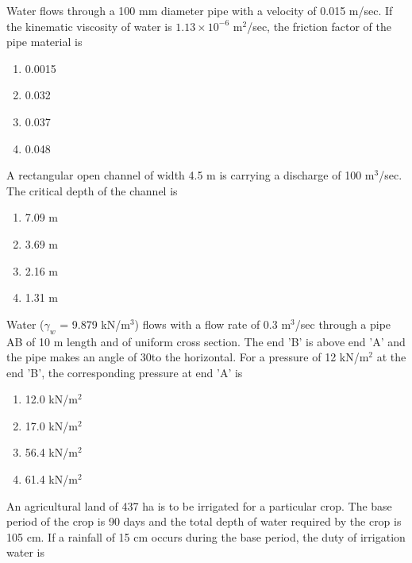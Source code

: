 \iffalse
\chapter{2009}
\author{AI24BTECH11009}
\section{ce}
\fi

\item Water flows through a 100 mm diameter pipe with a velocity of 0.015 m/sec. If the kinematic viscosity of water is $1.13 \times 10^{-6}$ $\text{m}^2$/sec, the friction factor of the pipe material is
    \begin{enumerate}
        \item 0.0015
        \item 0.032
        \item 0.037
        \item 0.048 \\
    \end{enumerate}
\item A rectangular open channel of width 4.5 m is carrying a discharge of 100 $\text{m}^3$/sec. The critical depth of the channel is
\begin{enumerate}
    \item 7.09 m
    \item 3.69 m
    \item 2.16 m
    \item 1.31 m \\
\end{enumerate}
\item Water ($\gamma_w$ = 9.879 kN/$\text{m}^3$) flows with a flow rate of 0.3 $\text{m}^3$/sec through a pipe AB of 10 m length and of uniform cross section. The end 'B' is above end 'A' and the pipe makes an angle of 30\degree to the horizontal. For a pressure of 12 kN/$\text{m}^2$ at the end 'B', the corresponding pressure at end 'A' is
\begin{enumerate}
    \item 12.0 kN/$\text{m}^2$
    \item 17.0 kN/$\text{m}^2$
    \item 56.4 kN/$\text{m}^2$
    \item 61.4 kN/$\text{m}^2$ \\
\end{enumerate}
\item An agricultural land of 437 ha is to be irrigated for a particular crop. The base period of the crop is 90 days and the total depth of water required by the crop is 105 cm. If a rainfall of 15 cm occurs during the base period, the duty of irrigation water is
